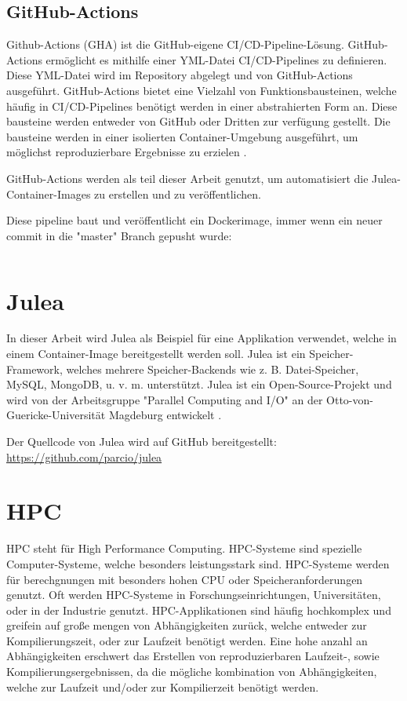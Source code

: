 \subsection{GitHub-Actions}

Github-Actions (GHA) ist die GitHub-eigene CI/CD-Pipeline-Lösung. GitHub-Actions ermöglicht es mithilfe einer YML-Datei CI/CD-Pipelines zu definieren. Diese YML-Datei wird im Repository abgelegt und von GitHub-Actions ausgeführt. GitHub-Actions bietet eine Vielzahl von Funktionsbausteinen, welche häufig in CI/CD-Pipelines benötigt werden in einer abstrahierten Form an. Diese bausteine werden entweder von GitHub oder Dritten zur verfügung gestellt. Die bausteine werden in einer isolierten Container-Umgebung ausgeführt, um möglichst reproduzierbare Ergebnisse zu erzielen \cite{githubGitHubActions}.

GitHub-Actions werden als teil dieser Arbeit genutzt, um automatisiert die Julea-Container-Images zu erstellen und zu veröffentlichen.

Diese pipeline baut und veröffentlicht ein Dockerimage, immer wenn ein neuer commit in die "master" Branch gepusht wurde:
\inputminted{yaml}{./code-examples/gha.yml} 

\section{Julea}

In dieser Arbeit wird Julea als Beispiel für eine Applikation verwendet, welche in einem Container-Image bereitgestellt werden soll. Julea ist ein Speicher-Framework, welches mehrere Speicher-Backends wie z. B. Datei-Speicher, MySQL, MongoDB, u. v. m. unterstützt. Julea ist ein Open-Source-Projekt und wird von der Arbeitsgruppe "Parallel Computing and I/O" an der Otto-von-Guericke-Universität Magdeburg entwickelt \cite{kuhnJULEAFlexibleStorage2017}.

Der Quellcode von Julea wird auf GitHub bereitgestellt: \url{https://github.com/parcio/julea}

\section{HPC}

HPC steht für High Performance Computing. HPC-Systeme sind spezielle Computer-Systeme, welche besonders leistungsstark sind. HPC-Systeme werden für berechgnungen mit besonders hohen CPU oder Speicheranforderungen genutzt. Oft werden HPC-Systeme in Forschungseinrichtungen, Universitäten, oder in der Industrie genutzt. HPC-Applikationen sind häufig hochkomplex und greifein auf große mengen von Abhängigkeiten zurück, welche entweder zur Kompilierungszeit, oder zur Laufzeit benötigt werden. Eine hohe anzahl an Abhängigkeiten erschwert das Erstellen von reproduzierbaren Laufzeit-, sowie Kompilierungsergebnissen, da die mögliche kombination von Abhängigkeiten, welche zur Laufzeit und/oder zur Kompilierzeit benötigt werden. 

